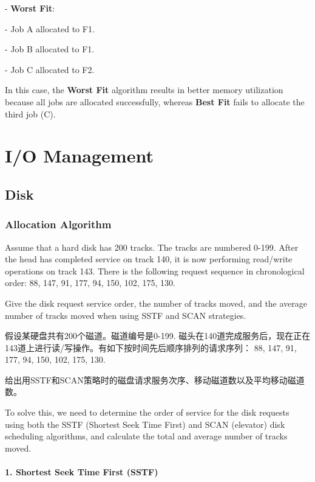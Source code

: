\documentclass[a4paper]{book}
\begin{document}
- \textbf{Worst Fit}:

  - Job A allocated to F1.
  
  - Job B allocated to F1.
  
  - Job C allocated to F2.

In this case, the \textbf{Worst Fit} algorithm results in better memory utilization because all jobs are allocated successfully, whereas \textbf{Best Fit} fails to allocate the third job (C).

\chapter{I/O Management}

\section{Disk}

\subsection{Allocation Algorithm}

\begin{greenbox}
Assume that a hard disk has 200 tracks. The tracks are numbered 0-199. After the head has completed service on track 140, it is now performing read/write operations on track 143. There is the following request sequence in chronological order:
88, 147, 91, 177, 94, 150, 102, 175, 130.

Give the disk request service order, the number of tracks moved, and the average number of tracks moved when using SSTF and SCAN strategies.
\end{greenbox}

假设某硬盘共有200个磁道。磁道编号是0-199. 磁头在140道完成服务后，现在正在143道上进行读/写操作。有如下按时间先后顺序排列的请求序列：
88, 147, 91, 177, 94, 150, 102, 175, 130.

给出用SSTF和SCAN策略时的磁盘请求服务次序、移动磁道数以及平均移动磁道数。

To solve this, we need to determine the order of service for the disk requests using both the SSTF (Shortest Seek Time First) and SCAN (elevator) disk scheduling algorithms, and calculate the total and average number of tracks moved.

\subsubsection{1. \textbf{Shortest Seek Time First (SSTF)}}
\end{document}
